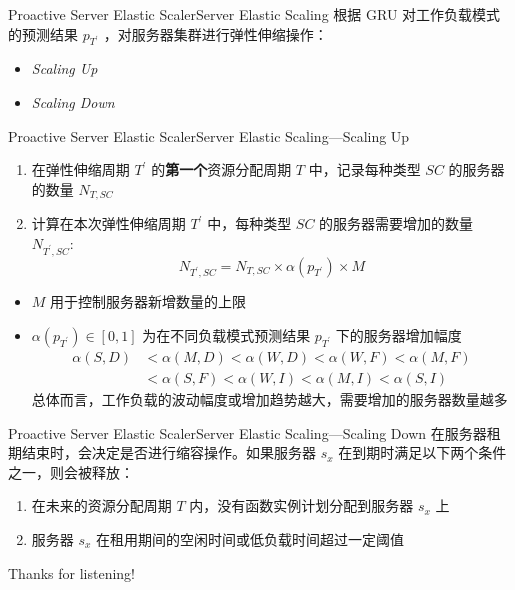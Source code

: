 \documentclass[aspectratio=169]{beamer}
\begin{document}
\begin{frame}{Proactive Server Elastic Scaler}{Server Elastic Scaling}
  根据 GRU 对工作负载模式的预测结果 $p_{T^\prime}$ ，对服务器集群进行弹性伸缩操作：
  \begin{itemize}
    \item \textit{Scaling Up}
    \item \textit{Scaling Down}
  \end{itemize}
\end{frame}

\begin{frame}{Proactive Server Elastic Scaler}{Server Elastic Scaling---Scaling Up}
  \begin{enumerate}
    \item 在弹性伸缩周期 $T^\prime$ 的\textbf{第一个}资源分配周期 $T$ 中，记录每种类型 $SC$ 的服务器的数量 $N_{T,SC}$
    \item 计算在本次弹性伸缩周期 $T^\prime$ 中，每种类型 $SC$ 的服务器需要增加的数量 $N_{T^\prime, SC}$: \[N_{T^\prime, SC} = N_{T, SC} \times \alpha (p_{T^\prime}) \times M\]
  \end{enumerate}
  \begin{itemize}
    \item $M$ 用于控制服务器新增数量的上限
    \item $\alpha (p_{T^\prime}) \in [0, 1]$ 为在不同负载模式预测结果 $p_{T^\prime}$ 下的服务器增加幅度
      \begin{align*}\alpha (S,D) &< \alpha (M,D) < \alpha (W,D) < \alpha (W,F) < \alpha (M,F) \\ &< \alpha (S,F) < \alpha (W,I) < \alpha (M,I) < \alpha (S,I)
      \end{align*} 总体而言，工作负载的波动幅度或增加趋势越大，需要增加的服务器数量越多
  \end{itemize}
\end{frame}

\begin{frame}{Proactive Server Elastic Scaler}{Server Elastic Scaling---Scaling Down}
  在服务器租期结束时，会决定是否进行缩容操作。如果服务器 $s_x$ 在到期时满足以下两个条件之一，则会被释放：
  \begin{enumerate}
    \item 在未来的资源分配周期 $T$ 内，没有函数实例计划分配到服务器 $s_x$ 上
    \item 服务器 $s_x$ 在租用期间的空闲时间或低负载时间超过一定阈值
  \end{enumerate}
\end{frame}

\begin{frame}

  \centering
  \Huge
  Thanks for listening!

\end{frame}
\end{document}
